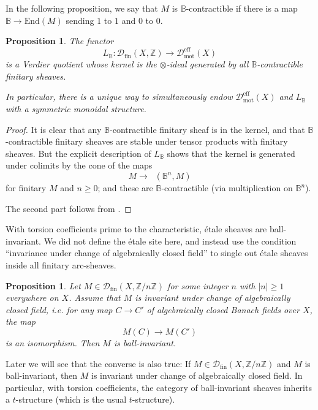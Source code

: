 \documentclass[11pt]{amsart}
\DeclareMathOperator{\intHom}{\!{\mathscr{H}\! om}}
\numberwithin{equation}{section}
\numberwithin{theorem}{section}
\newtheorem{proposition}[theorem]{Proposition}
\theoremstyle{definition}
\begin{document}
In the following proposition, we say that $M$ is $\mathbb B$-contractible if there is a map $\mathbb B\to \mathrm{End}(M)$ sending $1$ to $1$ and $0$ to $0$.

\begin{proposition} The functor
\[
L_{\mathbb B}: \mathcal D_{\mathrm{fin}}(X,\mathbb Z)\to \mathcal D_{\mathrm{mot}}^{\mathrm{eff}}(X)
\]
is a Verdier quotient whose kernel is the $\otimes$-ideal generated by all $\mathbb B$-contractible finitary sheaves.

In particular, there is a unique way to simultaneously endow $\mathcal D_{\mathrm{mot}}^{\mathrm{eff}}(X)$ and $L_{\mathbb B}$ with a symmetric monoidal structure.
\end{proposition}

\begin{proof} It is clear that any $\mathbb B$-contractible finitary sheaf is in the kernel, and that $\mathbb B$-contractible finitary sheaves are stable under tensor products with finitary sheaves. But the explicit description of $L_{\mathbb B}$ shows that the kernel is generated under colimits by the cone of the maps
\[
M\to \intHom(\mathbb B^n,M)
\]
for finitary $M$ and $n\geq 0$; and these are $\mathbb B$-contractible (via multiplication on $\mathbb B^n$).

The second part follows from \cite[Theorem I.3.6]{NikolausScholze}.
\end{proof}

With torsion coefficients prime to the characteristic, \'etale sheaves are ball-invariant. We did not define the \'etale site here, and instead use the condition ``invariance under change of algebraically closed field'' to single out \'etale sheaves inside all finitary arc-sheaves.

\begin{proposition}\label{prop:etalesheavesballinvariant} Let $M\in \mathcal D_{\mathrm{fin}}(X,\mathbb Z/n\mathbb Z)$ for some integer $n$ with $|n|\geq 1$ everywhere on $X$. Assume that $M$ is invariant under change of algebraically closed field, i.e. for any map $C\to C'$ of algebraically closed Banach fields over $X$, the map
\[
M(C)\to M(C')
\]
is an isomorphism. Then $M$ is ball-invariant.
\end{proposition}

Later we will see that the converse is also true: If $M\in \mathcal D_{\mathrm{fin}}(X,\mathbb Z/n\mathbb Z)$ and $M$ is ball-invariant, then $M$ is invariant under change of algebraically closed field. In particular, with torsion coefficients, the category of ball-invariant sheaves inherits a $t$-structure (which is the usual $t$-structure).
\end{document}
